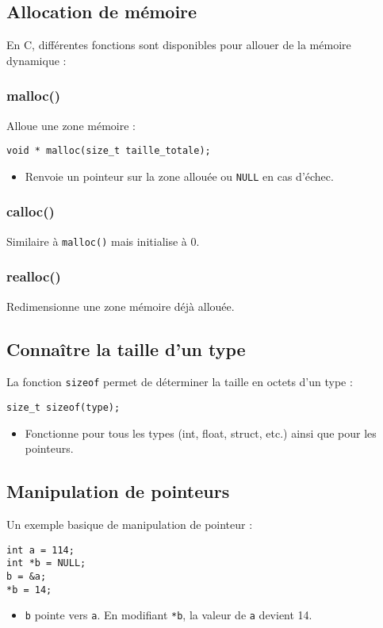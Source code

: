 \documentclass[french,11pt]{article}
\begin{document}
\subsection{Allocation de mémoire}
En C, différentes fonctions sont disponibles pour allouer de la mémoire dynamique :

\subsubsection{malloc()}
Alloue une zone mémoire :
\begin{verbatim}
void * malloc(size_t taille_totale);
\end{verbatim}
\begin{itemize}
    \item Renvoie un pointeur sur la zone allouée ou \texttt{NULL} en cas d’échec.
\end{itemize}

\subsubsection{calloc()}
Similaire à \texttt{malloc()} mais initialise à 0.

\subsubsection{realloc()}
Redimensionne une zone mémoire déjà allouée.

\subsection{Connaître la taille d’un type}
La fonction \texttt{sizeof} permet de déterminer la taille en octets d’un type :
\begin{verbatim}
size_t sizeof(type);
\end{verbatim}
\begin{itemize}
    \item Fonctionne pour tous les types (int, float, struct, etc.) ainsi que pour les pointeurs.
\end{itemize}

\subsection{Manipulation de pointeurs}
Un exemple basique de manipulation de pointeur :
\begin{verbatim}
int a = 114;
int *b = NULL;
b = &a;
*b = 14;
\end{verbatim}
\begin{itemize}
    \item \texttt{b} pointe vers \texttt{a}. En modifiant \texttt{*b}, la valeur de \texttt{a} devient 14.
\end{itemize}
\end{document}
